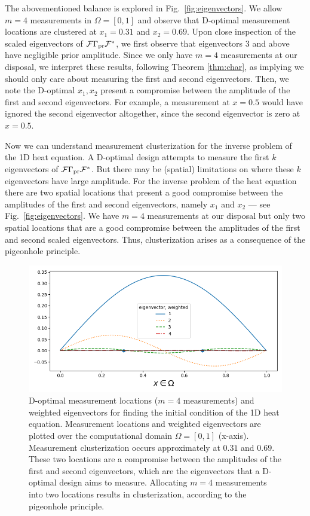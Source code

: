 \documentclass[ba]{imsart}
\newcommand{\fwd}{\mathcal{F}}
\theoremstyle{plain}
\theoremstyle{definition}
\theoremstyle{remark}
\begin{document}
The abovementioned balance is explored in
Fig.~\ref{fig:eigenvectors}. We allow $m=4$ measurements in $\Omega =
[0,1]$ and observe that D-optimal measurement locations are clustered
at $x_1 = 0.31$ and $x_2 = 0.69$. Upon close inspection of the scaled
eigenvectors of $\fwd \prcov \fwd^*$, we first observe that
eigenvectors $3$ and above have negligible prior amplitude. Since we
only have $m=4$ measurements at our disposal, we interpret these
results, following Theorem \ref{thm:char}, as implying we should only
care about measuring the first and second eigenvectors. Then, we note
the D-optimal $x_1,x_2$ present a compromise between the amplitude of
the first and second eigenvectors. For example, a measurement at
$x=0.5$ would have ignored the second eigenvector altogether, since
the second eigenvector is zero at $x=0.5$.

Now we can understand measurement clusterization for the inverse
problem of the 1D heat equation. A D-optimal design attempts to
measure the first $k$ eigenvectors of $\fwd \prcov \fwd^*$. But there
may be (spatial) limitations on where these $k$ eigenvectors have
large amplitude. For the inverse problem of the heat equation there
are two spatial locations that present a good compromise between the
amplitudes of the first and second eigenvectors, namely $x_1$ and
$x_2$ --- see Fig.~\ref{fig:eigenvectors}. We have $m=4$ measurements
at our disposal but only two spatial locations that are a good
compromise between the amplitudes of the first and second scaled
eigenvectors. Thus, clusterization arises as a consequence of the
pigeonhole principle.

\begin{figure}\label{fig:eigenvectors}
    \centering
    \includegraphics[width=\textwidth]{figs/eigenvectors_dst_scaled.png}
    \caption{D-optimal measurement locations ($m=4$ measurements) and
      weighted eigenvectors for finding the initial condition of the
      1D heat equation. Measurement locations and weighted
      eigenvectors are plotted over the computational domain $\Omega =
      [0, 1]$ (x-axis). Measurement clusterization occurs
      approximately at $0.31$ and $0.69$. These two locations are a
      compromise between the amplitudes of the first and second
      eigenvectors, which are the eigenvectors that a D-optimal design
      aims to measure. Allocating $m=4$ measurements into two
      locations results in clusterization, according to the pigeonhole
      principle.}
  \label{fig:why}
\end{figure}
\end{document}
